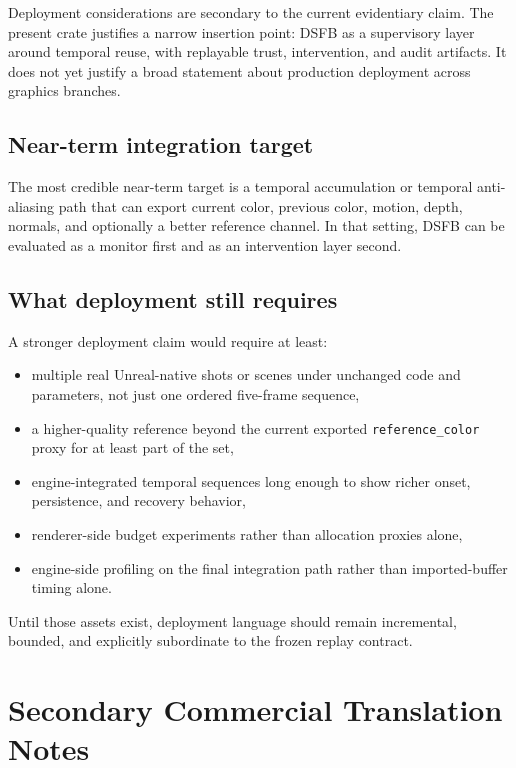 \documentclass[11pt]{article}
\theoremstyle{definition}
\theoremstyle{plain}
\begin{document}
Deployment considerations are secondary to the current evidentiary claim. The present crate justifies a narrow insertion point: DSFB as a supervisory layer around temporal reuse, with replayable trust, intervention, and audit artifacts. It does not yet justify a broad statement about production deployment across graphics branches.

\subsection{Near-term integration target}

The most credible near-term target is a temporal accumulation or temporal anti-aliasing path that can export current color, previous color, motion, depth, normals, and optionally a better reference channel. In that setting, DSFB can be evaluated as a monitor first and as an intervention layer second.

\subsection{What deployment still requires}

A stronger deployment claim would require at least:
\begin{itemize}[leftmargin=1.5em]
    \item multiple real Unreal-native shots or scenes under unchanged code and parameters, not just one ordered five-frame sequence,
    \item a higher-quality reference beyond the current exported \texttt{reference\_color} proxy for at least part of the set,
    \item engine-integrated temporal sequences long enough to show richer onset, persistence, and recovery behavior,
    \item renderer-side budget experiments rather than allocation proxies alone,
    \item engine-side profiling on the final integration path rather than imported-buffer timing alone.
\end{itemize}

Until those assets exist, deployment language should remain incremental, bounded, and explicitly subordinate to the frozen replay contract.

\section{Secondary Commercial Translation Notes}
\label{sec:commercial}
\end{document}
